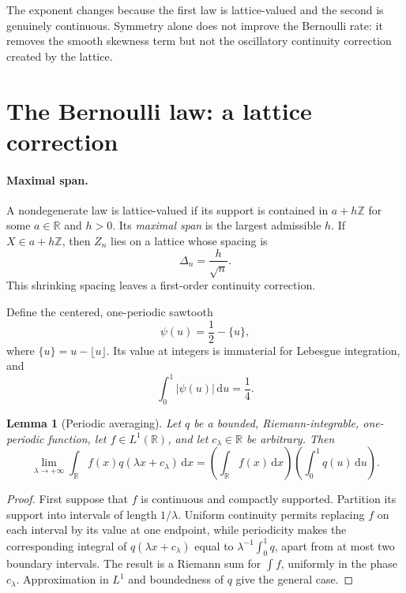 \documentclass[11pt]{article}
\newtheorem{lemma}[theorem]{Lemma}
\theoremstyle{remark}
\newcommand{\R}{\mathbb{R}}
\newcommand{\dd}{\,\mathrm{d}}
\newcommand{\abs}[1]{\left\lvert #1\right\rvert}
\begin{document}
The exponent changes because the first law is lattice-valued and the second
is genuinely continuous. Symmetry alone does not improve the Bernoulli rate:
it removes the smooth skewness term but not the oscillatory continuity
correction created by the lattice.

\section{The Bernoulli law: a lattice correction}

\paragraph{Maximal span.}
A nondegenerate law is lattice-valued if its support is contained in
$a+h\mathbb Z$ for some $a\in\R$ and $h>0$. Its \emph{maximal span} is the
largest admissible $h$. If $X\in a+h\mathbb Z$, then $Z_n$ lies on a lattice
whose spacing is
\begin{equation}\label{eq:normalized-span}
  \Delta_n=\frac{h}{\sqrt n}.
\end{equation}
This shrinking spacing leaves a first-order continuity correction.

Define the centered, one-periodic sawtooth
\begin{equation}\label{eq:sawtooth}
  \psi(u)=\frac12-\{u\},
\end{equation}
where $\{u\}=u-\lfloor u\rfloor$. Its value at integers is immaterial for
Lebesgue integration, and
\begin{equation}\label{eq:sawtooth-average}
  \int_0^1\abs{\psi(u)}\dd u=\frac14.
\end{equation}

\begin{lemma}[Periodic averaging]\label{lem:periodic-averaging}
Let $q$ be a bounded, Riemann-integrable, one-periodic function, let
$f\in L^1(\R)$, and let $c_\lambda\in\R$ be arbitrary. Then
\begin{equation}\label{eq:periodic-averaging}
  \lim_{\lambda\to+\infty}
  \int_{\R}f(x)q(\lambda x+c_\lambda)\dd x
  =
  \left(\int_{\R}f(x)\dd x\right)
  \left(\int_0^1q(u)\dd u\right).
\end{equation}
\end{lemma}

\begin{proof}
First suppose that $f$ is continuous and compactly supported. Partition its
support into intervals of length $1/\lambda$. Uniform continuity permits
replacing $f$ on each interval by its value at one endpoint, while periodicity
makes the corresponding integral of $q(\lambda x+c_\lambda)$ equal to
$\lambda^{-1}\int_0^1q$, apart from at most two boundary intervals. The
result is a Riemann sum for $\int f$, uniformly in the phase $c_\lambda$.
Approximation in $L^1$ and boundedness of $q$ give the general case.
\end{proof}
\end{document}
